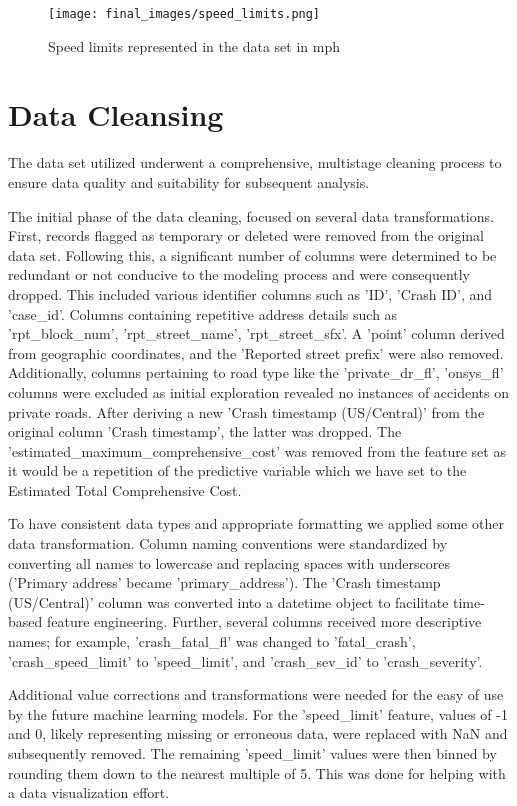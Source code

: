 \documentclass[conference]{IEEEtran}
\begin{document}
\begin{figure}
    \centering
    \texttt{[image: final\_images/speed\_limits.png]}
    \caption{Speed limits represented in the data set in mph}
    \label{fig:enter-label}
\end{figure}

\section{Data Cleansing}
The data set utilized underwent a comprehensive, multistage cleaning process to ensure data quality and suitability for subsequent analysis.

The initial phase of the data cleaning, focused on several data transformations. First, records flagged as temporary or deleted were removed from the original data set. Following this, a significant number of columns were determined to be redundant or not conducive to the modeling process and were consequently dropped. This included various identifier columns such as 'ID', 'Crash ID', and 'case\_id'. Columns containing repetitive address details such as 'rpt\_block\_num', 'rpt\_street\_name', 'rpt\_street\_sfx'. A 'point' column derived from geographic coordinates, and the 'Reported street prefix' were also removed. Additionally, columns pertaining to road type like the 'private\_dr\_fl', 'onsys\_fl' columns were excluded as initial exploration revealed no instances of accidents on private roads. After deriving a new 'Crash timestamp (US/Central)' from the original column 'Crash timestamp', the latter was dropped. The 'estimated\_maximum\_comprehensive\_cost' was removed from the feature set as it would be a repetition of the predictive variable which we have set to the Estimated Total Comprehensive Cost.

To have consistent data types and appropriate formatting we applied some other data transformation. Column naming conventions were standardized by converting all names to lowercase and replacing spaces with underscores ('Primary address' became 'primary\_address'). The 'Crash timestamp (US/Central)' column was converted into a datetime object to facilitate time-based feature engineering. Further, several columns received more descriptive names; for example, 'crash\_fatal\_fl' was changed to 'fatal\_crash', 'crash\_speed\_limit' to 'speed\_limit', and 'crash\_sev\_id' to 'crash\_severity'.

Additional value corrections and transformations were needed for the easy of use by the future machine learning models. For the 'speed\_limit' feature, values of -1 and 0, likely representing missing or erroneous data, were replaced with NaN and subsequently removed. The remaining 'speed\_limit' values were then binned by rounding them down to the nearest multiple of 5. This was done for helping with a data visualization effort. 
\end{document}
